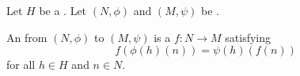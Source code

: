 \begin{definition} \label{definition:H_equivariant_group_homomorphism_for_a_fixed_group}
    Let $H$ be a . Let $(N, \phi)$ and $(M, \psi)$ be .

    An  from $(N, \phi)$ to $(M, \psi)$ is a  $f: N \to M$ satisfying
    $$f(\phi(h)(n)) = \psi(h)(f(n))$$
    for all $h \in H$ and $n \in N$.
\end{definition}
